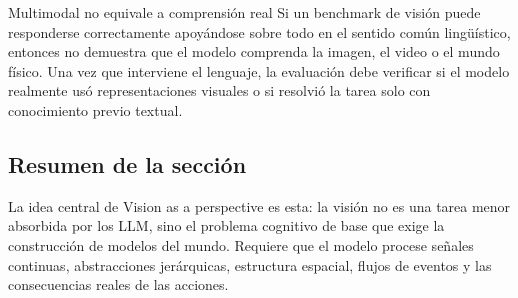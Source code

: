 \begin{warningbox}{Multimodal no equivale a comprensión real}
Si un benchmark de visión puede responderse correctamente apoyándose sobre todo en el sentido común lingüístico, entonces no demuestra que el modelo comprenda la imagen, el video o el mundo físico. Una vez que interviene el lenguaje, la evaluación debe verificar si el modelo realmente usó representaciones visuales o si resolvió la tarea solo con conocimiento previo textual.
\end{warningbox}

\subsection{Resumen de la sección}

La idea central de Vision as a perspective es esta: la visión no es una tarea menor absorbida por los LLM, sino el problema cognitivo de base que exige la construcción de modelos del mundo. Requiere que el modelo procese señales continuas, abstracciones jerárquicas, estructura espacial, flujos de eventos y las consecuencias reales de las acciones.
